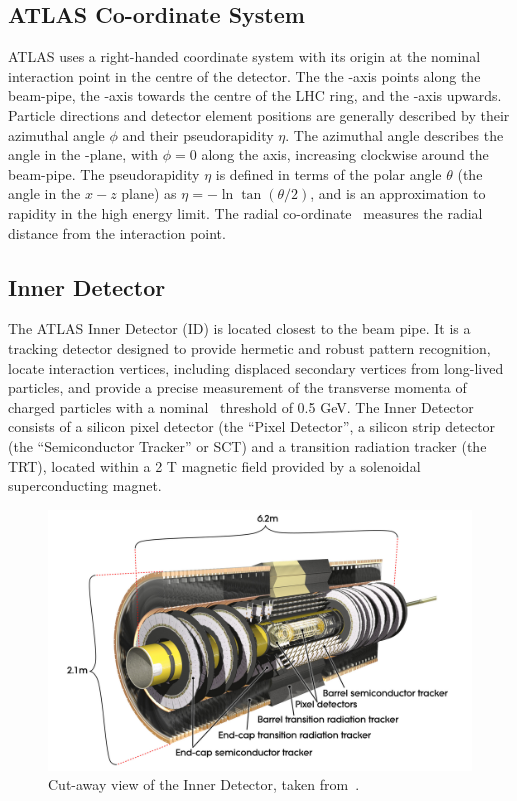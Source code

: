 \subsection{ATLAS Co-ordinate System}
ATLAS uses a right-handed coordinate system with its origin at the nominal
interaction point in the centre of the detector. The 
the \z-axis points along the beam-pipe, the \x-axis towards the 
centre of the LHC ring, and the \y-axis upwards. Particle directions and
detector element positions are generally described by their azimuthal angle
$\phi$ and their  pseudorapidity $\eta$. The azimuthal angle describes the angle
in the \x-\y plane, with $\phi=0$ along the \x axis, increasing clockwise
around the beam-pipe.
The pseudorapidity $\eta$ is defined in terms of the polar angle $\theta$ (the
angle in the $x-z$ plane) as $\eta = - \ln\tan(\theta/2)$, and is an
approximation to rapidity in the high energy limit.
The radial co-ordinate \R\ measures the radial distance from the interaction
point. 

\subsection{Inner Detector}

The ATLAS Inner Detector (ID) is located closest to the beam pipe. It is a tracking
detector designed to provide hermetic and robust pattern recognition, locate
interaction vertices, including displaced secondary vertices from long-lived
particles, and provide a precise measurement of the transverse momenta of charged
particles with a nominal \pt\ threshold of 0.5 GeV. The Inner Detector consists
of a silicon pixel detector (the ``Pixel Detector'', a silicon strip detector (the ``Semiconductor
Tracker'' or SCT) and a transition radiation tracker (the TRT), located within a
2 T magnetic field provided by a solenoidal superconducting magnet.

\begin{figure}[h]
\centering
\includegraphics[width=\textwidth]{ID_newTRT_d3}
\caption{Cut-away view of the Inner Detector, taken from~\cite{Aad:1125884}.}
\label{fig:id-1}
\end{figure}

